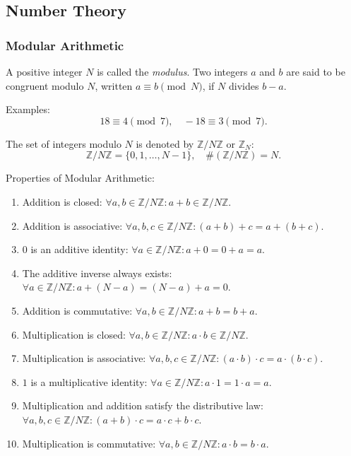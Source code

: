 \newcommand{\floor}[1]{\left\lfloor #1 \right\rfloor}

\subsection{Number Theory}

\subsubsection{Modular Arithmetic}
\begin{defn}
A positive integer \( N \) is called the \emph{modulus}. Two integers \( a \) and \( b \) are said to be congruent modulo \( N \), written \( a \equiv b \pmod{N} \), if \( N \) divides \( b - a \).
\end{defn}    

Examples:
\[
18 \equiv 4 \pmod{7}, \quad -18 \equiv 3 \pmod{7}.
\]

The set of integers modulo \( N \) is denoted by \( \mathbb{Z}/N\mathbb{Z} \) or \( \mathbb{Z}_N \):
\[
\mathbb{Z}/N\mathbb{Z} = \{ 0, 1, \dots, N-1 \}, \quad \#(\mathbb{Z}/N\mathbb{Z}) = N.
\]

Properties of Modular Arithmetic:
\begin{enumerate}
    \item Addition is closed: \(\forall a, b \in \mathbb{Z}/N\mathbb{Z} : a + b \in \mathbb{Z}/N\mathbb{Z}\).
    \item Addition is associative: \(\forall a, b, c \in \mathbb{Z}/N\mathbb{Z} : (a + b) + c = a + (b + c)\).
    \item \(0\) is an additive identity: \(\forall a \in \mathbb{Z}/N\mathbb{Z} : a + 0 = 0 + a = a\).
    \item The additive inverse always exists: \(\forall a \in \mathbb{Z}/N\mathbb{Z} : a + (N - a) = (N - a) + a = 0\).
    \item Addition is commutative: \(\forall a, b \in \mathbb{Z}/N\mathbb{Z} : a + b = b + a\).
    \item Multiplication is closed: \(\forall a, b \in \mathbb{Z}/N\mathbb{Z} : a \cdot b \in \mathbb{Z}/N\mathbb{Z}\).
    \item Multiplication is associative: \(\forall a, b, c \in \mathbb{Z}/N\mathbb{Z} : (a \cdot b) \cdot c = a \cdot (b \cdot c)\).
    \item \(1\) is a multiplicative identity: \(\forall a \in \mathbb{Z}/N\mathbb{Z} : a \cdot 1 = 1 \cdot a = a\).
    \item Multiplication and addition satisfy the distributive law: \(\forall a, b, c \in \mathbb{Z}/N\mathbb{Z} : (a + b) \cdot c = a \cdot c + b \cdot c\).
    \item Multiplication is commutative: \(\forall a, b \in \mathbb{Z}/N\mathbb{Z} : a \cdot b = b \cdot a\).
\end{enumerate}

